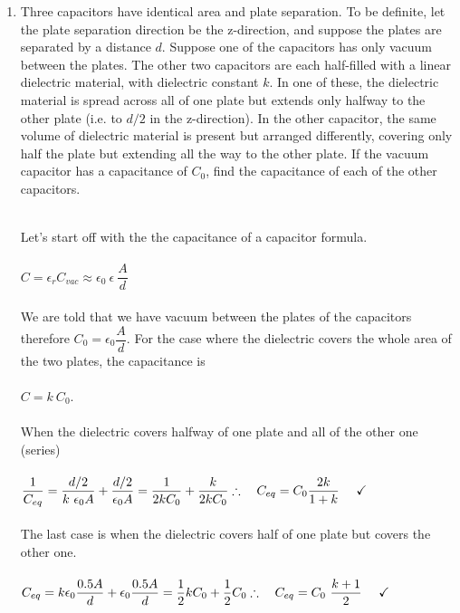 \documentclass[fleqn]{article}
\begin{document}
\begin{enumerate}
    \pagebreak
  
    \item Three capacitors have identical area and plate separation. To be definite, let the plate separation direction be 
    the z-direction, and suppose the plates are separated by a distance $d$. Suppose one of the capacitors has only vacuum between the plates. The other two capacitors are
    each half-filled with a linear dielectric material, with dielectric constant $k$. In one of these, the dielectric material is 
    spread across all of one plate but extends only halfway to the other plate (i.e. to $d/2$ in the z-direction). In the other 
    capacitor, the same volume of dielectric material is present but arranged differently, covering only half the plate
    but extending all the way to the other plate. If the vacuum capacitor has a capacitance of $C_0$, find the capacitance of each 
    of the other capacitors.

      \textcolor{hwColor}{
        \\
        Let's start off with the the capacitance of a capacitor formula.
        \\
        \\
        $
          C=\epsilon_r C_{vac} \approx \epsilon_0 ~ \epsilon ~ \dfrac{A}{d}
        $
        \\
        \\
        We are told that we have vacuum between the plates of the capacitors therefore $C_0=\epsilon_0\dfrac{A}{d}$. For the case where 
        the dielectric covers the whole area of the two plates, the capacitance is
        \\
        \\
        $
          C=k ~ C_0
        $. 
        \\
        \\
        When the dielectric covers halfway of one plate and all of the other one (series)
        \\
        \\
        $
          \dfrac{1}{C_{eq}}=\dfrac{d/2}{k ~ \epsilon_0 A}+\dfrac{d/2}{\epsilon_0 A}=\dfrac{1}{2k C_0}+\dfrac{k}{2kC_0}
          \\
          \\
          \\
          \therefore ~~~ C_{eq}=C_0\dfrac{2k}{1+k} ~~~~ \checkmark
        $   
        \\
        \\
        The last case is when the dielectric covers half of one plate but covers the other one.
        \\
        \\
        $
          C_{eq}=k \epsilon_0 \dfrac{0.5 A}{d}+\epsilon_0 \dfrac{0.5 A}{d}=\dfrac{1}{2} k C_0+\dfrac{1}{2} C_0
          \\
          \\
          \\
          \therefore ~~~ C_{eq}=C_0 ~ \dfrac{k+1}{2} ~~~~ \checkmark
          \\
          \\
        $
      }

  \end{enumerate}
\end{document}
